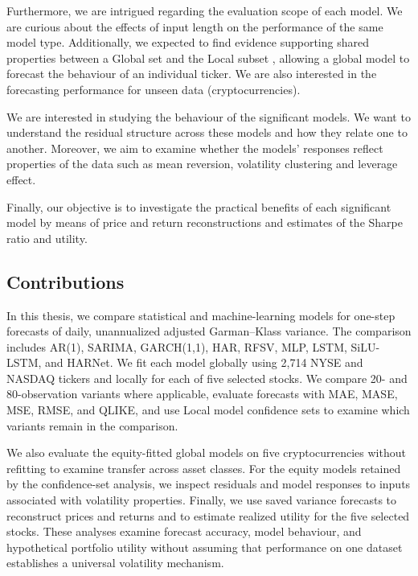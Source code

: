 \documentclass[12pt,a4paper]{article}
\numberwithin{equation}{section}
\numberwithin{table}{section}
\numberwithin{figure}{section}
\begin{document}
Furthermore, we are intrigued regarding the evaluation scope of each model. We are curious about the effects of input length on the performance of the same model type. Additionally, we expected to find evidence supporting shared properties between a Global set and the Local subset \cite{monteromanso2021,tang2023,liu2023}, allowing a global model to forecast the behaviour of an individual ticker. We are also interested in the forecasting performance for unseen data (cryptocurrencies). 

We are interested in studying the behaviour of the significant models. We want to understand the residual structure across these models and how they relate one to another. Moreover, we aim to examine whether the models' responses reflect properties of the data such as mean reversion, volatility clustering and leverage effect. 

Finally, our objective is to investigate the practical benefits of each significant model by means of price and return reconstructions and estimates of the Sharpe ratio and utility. 

\subsection{Contributions}
In this thesis, we compare statistical and machine-learning models for one-step forecasts of daily, unannualized adjusted Garman--Klass variance. The comparison includes AR(1), SARIMA, GARCH(1,1), HAR, RFSV, MLP, LSTM, SiLU-LSTM, and HARNet. We fit each model globally using 2,714 NYSE and NASDAQ tickers and locally for each of five selected stocks. We compare 20- and 80-observation variants where applicable, evaluate forecasts with MAE, MASE, MSE, RMSE, and QLIKE, and use Local model confidence sets to examine which variants remain in the comparison.

We also evaluate the equity-fitted global models on five cryptocurrencies without refitting to examine transfer across asset classes. For the equity models retained by the confidence-set analysis, we inspect residuals and model responses to inputs associated with volatility properties. Finally, we use saved variance forecasts to reconstruct prices and returns and to estimate realized utility for the five selected stocks. These analyses examine forecast accuracy, model behaviour, and hypothetical portfolio utility without assuming that performance on one dataset establishes a universal volatility mechanism.
\end{document}
